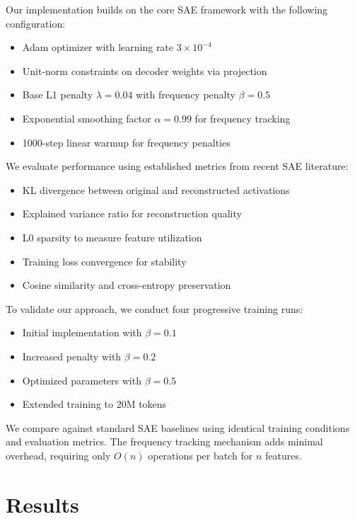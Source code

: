 \documentclass{article} %
\begin{document}
Our implementation builds on the core SAE framework with the following configuration:

\begin{itemize}
    \item Adam optimizer with learning rate $3 \times 10^{-4}$
    \item Unit-norm constraints on decoder weights via projection
    \item Base L1 penalty $\lambda = 0.04$ with frequency penalty $\beta = 0.5$
    \item Exponential smoothing factor $\alpha = 0.99$ for frequency tracking
    \item 1000-step linear warmup for frequency penalties
\end{itemize}

We evaluate performance using established metrics from recent SAE literature:

\begin{itemize}
    \item KL divergence between original and reconstructed activations
    \item Explained variance ratio for reconstruction quality
    \item L0 sparsity to measure feature utilization
    \item Training loss convergence for stability
    \item Cosine similarity and cross-entropy preservation
\end{itemize}

To validate our approach, we conduct four progressive training runs:
\begin{itemize}
    \item Initial implementation with $\beta = 0.1$
    \item Increased penalty with $\beta = 0.2$ 
    \item Optimized parameters with $\beta = 0.5$
    \item Extended training to 20M tokens
\end{itemize}

We compare against standard SAE baselines using identical training conditions and evaluation metrics. The frequency tracking mechanism adds minimal overhead, requiring only $O(n)$ operations per batch for $n$ features.

\section{Results}
\label{sec:results}
\end{document}
